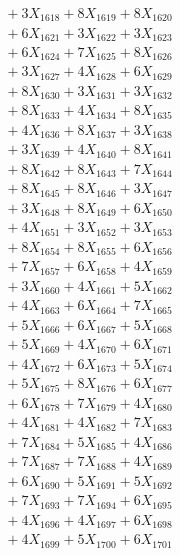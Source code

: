 \documentclass[a4paper,10pt]{article}
\begin{document}
{\begin{align}
&\;  + 3 X_{1618} + 8 X_{1619} + 8 X_{1620} \\[0.3ex]
&\;  + 6 X_{1621} + 3 X_{1622} + 3 X_{1623} \\[0.3ex]
&\;  + 6 X_{1624} + 7 X_{1625} + 8 X_{1626} \\[0.3ex]
&\;  + 3 X_{1627} + 4 X_{1628} + 6 X_{1629} \\[0.5ex]\allowbreak
&\;  + 8 X_{1630} + 3 X_{1631} + 3 X_{1632} \\[0.3ex]
&\;  + 8 X_{1633} + 4 X_{1634} + 8 X_{1635} \\[0.3ex]
&\;  + 4 X_{1636} + 8 X_{1637} + 3 X_{1638} \\[0.3ex]
&\;  + 3 X_{1639} + 4 X_{1640} + 8 X_{1641} \\[0.3ex]
&\;  + 8 X_{1642} + 8 X_{1643} + 7 X_{1644} \\[0.3ex]
&\;  + 8 X_{1645} + 8 X_{1646} + 3 X_{1647} \\[0.3ex]
&\;  + 3 X_{1648} + 8 X_{1649} + 6 X_{1650} \\[0.3ex]
&\;  + 4 X_{1651} + 3 X_{1652} + 3 X_{1653} \\[0.3ex]
&\;  + 8 X_{1654} + 8 X_{1655} + 6 X_{1656} \\[0.3ex]
&\;  + 7 X_{1657} + 6 X_{1658} + 4 X_{1659} \\[0.5ex]\allowbreak
&\;  + 3 X_{1660} + 4 X_{1661} + 5 X_{1662} \\[0.3ex]
&\;  + 4 X_{1663} + 6 X_{1664} + 7 X_{1665} \\[0.3ex]
&\;  + 5 X_{1666} + 6 X_{1667} + 5 X_{1668} \\[0.3ex]
&\;  + 5 X_{1669} + 4 X_{1670} + 6 X_{1671} \\[0.3ex]
&\;  + 4 X_{1672} + 6 X_{1673} + 5 X_{1674} \\[0.3ex]
&\;  + 5 X_{1675} + 8 X_{1676} + 6 X_{1677} \\[0.3ex]
&\;  + 6 X_{1678} + 7 X_{1679} + 4 X_{1680} \\[0.3ex]
&\;  + 4 X_{1681} + 4 X_{1682} + 7 X_{1683} \\[0.3ex]
&\;  + 7 X_{1684} + 5 X_{1685} + 4 X_{1686} \\[0.3ex]
&\;  + 7 X_{1687} + 7 X_{1688} + 4 X_{1689} \\[0.5ex]\allowbreak
&\;  + 6 X_{1690} + 5 X_{1691} + 5 X_{1692} \\[0.3ex]
&\;  + 7 X_{1693} + 7 X_{1694} + 6 X_{1695} \\[0.3ex]
&\;  + 4 X_{1696} + 4 X_{1697} + 6 X_{1698} \\[0.3ex]
&\;  + 4 X_{1699} + 5 X_{1700} + 6 X_{1701} \\[0.3ex]

\end{align}}
\end{document}
